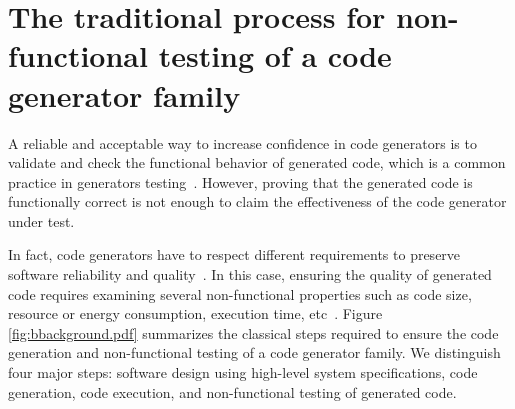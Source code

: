 
\section{The traditional process for non-functional testing of a code generator family}
\label{sec:trad}
A reliable and acceptable way to increase confidence in code generators is to validate and check the functional behavior of generated code, which is a common practice in generators testing~\cite{jorges2014back,stuermer2007systematic,sturmer2005overview}.
However, proving that the generated code is functionally correct is not enough to claim the effectiveness of the code generator under test. 

In fact, code generators have to respect different requirements to preserve software reliability and quality~\cite{demertzi2011analyzing}. 
In this case, ensuring the quality of generated code requires examining several non-functional properties such as code size, resource or energy consumption, execution time, etc~\cite{pan2006fast}.
Figure \ref{fig:bbackground.pdf} summarizes the classical steps required to ensure the code generation and non-functional testing of a code generator family. 
We distinguish four major steps: software design using high-level system specifications, code generation, code execution, and non-functional testing of generated code. 


